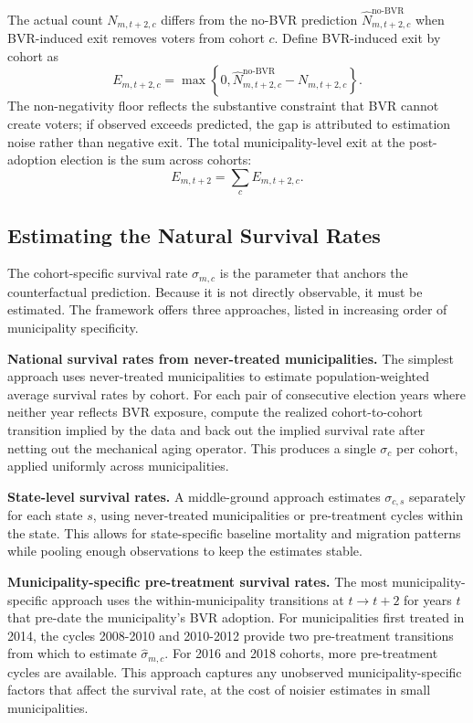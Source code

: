 The actual count $N_{m,t+2,c}$ differs from the no-BVR prediction $\widehat{N}_{m,t+2,c}^{\text{no-BVR}}$ when BVR-induced exit removes voters from cohort $c$. Define BVR-induced exit by cohort as
\begin{equation}
E_{m,t+2,c} = \max\left\{0, \widehat{N}_{m,t+2,c}^{\text{no-BVR}} - N_{m,t+2,c}\right\}.
\label{eq:exit_cohort}
\end{equation}
The non-negativity floor reflects the substantive constraint that BVR cannot create voters; if observed exceeds predicted, the gap is attributed to estimation noise rather than negative exit. The total municipality-level exit at the post-adoption election is the sum across cohorts:
\begin{equation}
E_{m,t+2} = \sum_c E_{m,t+2,c}.
\label{eq:exit_total}
\end{equation}

\subsection{Estimating the Natural Survival Rates}
\label{ssec:decomposition_mun_survival}

The cohort-specific survival rate $\sigma_{m,c}$ is the parameter that anchors the counterfactual prediction. Because it is not directly observable, it must be estimated. The framework offers three approaches, listed in increasing order of municipality specificity.

\textbf{National survival rates from never-treated municipalities.} The simplest approach uses never-treated municipalities to estimate population-weighted average survival rates by cohort. For each pair of consecutive election years where neither year reflects BVR exposure, compute the realized cohort-to-cohort transition implied by the data and back out the implied survival rate after netting out the mechanical aging operator. This produces a single $\sigma_c$ per cohort, applied uniformly across municipalities.

\textbf{State-level survival rates.} A middle-ground approach estimates $\sigma_{c,s}$ separately for each state $s$, using never-treated municipalities or pre-treatment cycles within the state. This allows for state-specific baseline mortality and migration patterns while pooling enough observations to keep the estimates stable.

\textbf{Municipality-specific pre-treatment survival rates.} The most municipality-specific approach uses the within-municipality transitions at $t \to t+2$ for years $t$ that pre-date the municipality's BVR adoption. For municipalities first treated in 2014, the cycles 2008-2010 and 2010-2012 provide two pre-treatment transitions from which to estimate $\hat\sigma_{m,c}$. For 2016 and 2018 cohorts, more pre-treatment cycles are available. This approach captures any unobserved municipality-specific factors that affect the survival rate, at the cost of noisier estimates in small municipalities.

